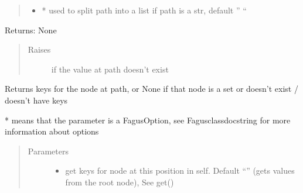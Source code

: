 \documentclass[a4paper,10pt,english]{sphinxmanual}
\begin{document}
\begin{fulllineitems}
\begin{fulllineitems}
\begin{quote}
\begin{description}
\begin{itemize}
\item {}
\sphinxAtStartPar
{} \textendash{} * used to split path into a list if path is a str, default ” “

\end{itemize}

\end{description}\end{quote}

\sphinxAtStartPar
Returns: None
\begin{quote}\begin{description}
\item[{Raises}] \leavevmode
\sphinxAtStartPar
{} \textendash{} if the value at path doesn’t exist

\end{description}\end{quote}

\end{fulllineitems}


\begin{fulllineitems}
\label{\detokenize{fagus.fagus:fagus.fagus.Fagus.keys}}
\pysigstartsignatures
{}
\pysigstopsignatures
\sphinxAtStartPar
Returns keys for the node at path, or None if that node is a set or doesn’t exist / doesn’t have keys

\sphinxAtStartPar
* means that the parameter is a FagusOption, see Fagus\sphinxhyphen{}class\sphinxhyphen{}docstring for more information about options
\begin{quote}\begin{description}
\item[{Parameters}] \leavevmode\begin{itemize}
\item {}
\sphinxAtStartPar
{} \textendash{} get keys for node at this position in self. Default “” (gets values from the root node), See get()


\end{itemize}
\end{description}
\end{quote}
\end{fulllineitems}
\end{fulllineitems}
\end{document}
